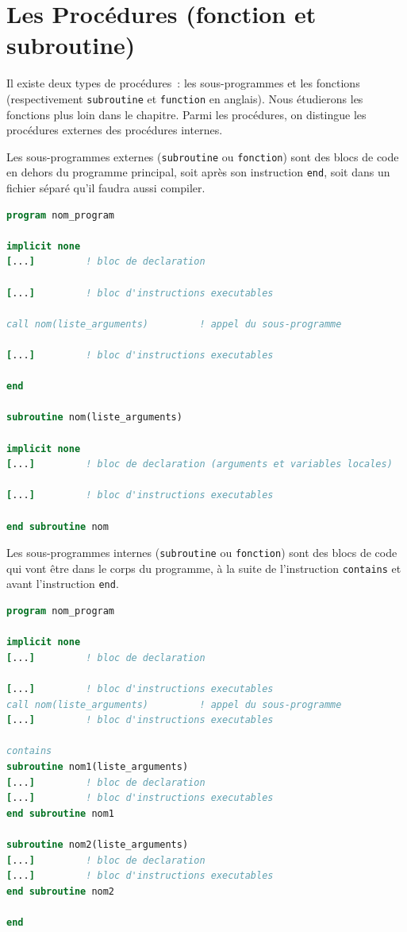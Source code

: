 \documentclass[a4paper,twoside]{article}
\begin{document}
\section{Les Procédures (fonction et subroutine)}
Il existe deux types de procédures~: les sous-programmes et les fonctions (respectivement \texttt{subroutine} et \texttt{function} en anglais). Nous étudierons les fonctions plus loin dans le chapitre. Parmi les procédures, on distingue les procé\-dures externes des procédures internes.

\bigskip

Les sous-programmes externes (\texttt{subroutine} ou \texttt{fonction}) sont des blocs de code en dehors du programme principal, soit après son instruction \texttt{end}, soit dans un fichier séparé qu'il faudra aussi compiler. 
\begin{lstlisting}[language=Fortran]
program nom_program
 
implicit none 
[...]         ! bloc de declaration
 
[...]         ! bloc d'instructions executables
 
call nom(liste_arguments)         ! appel du sous-programme
 
[...]         ! bloc d'instructions executables
 
end  

subroutine nom(liste_arguments)

implicit none 
[...]         ! bloc de declaration (arguments et variables locales)

[...]         ! bloc d'instructions executables
 
end subroutine nom 
\end{lstlisting}


Les sous-programmes internes (\texttt{subroutine} ou \texttt{fonction}) sont des blocs de code qui vont être dans le corps du programme, à la suite de l'instruction \texttt{contains} et avant l'instruction \texttt{end}.
\begin{lstlisting}[language=Fortran]
program nom_program
 
implicit none 
[...]         ! bloc de declaration
 
[...]         ! bloc d'instructions executables 
call nom(liste_arguments)         ! appel du sous-programme 
[...]         ! bloc d'instructions executables 

contains 
subroutine nom1(liste_arguments) 
[...]         ! bloc de declaration 
[...]         ! bloc d'instructions executables 
end subroutine nom1 

subroutine nom2(liste_arguments) 
[...]         ! bloc de declaration 
[...]         ! bloc d'instructions executables 
end subroutine nom2 

end
\end{lstlisting}
\end{document}

